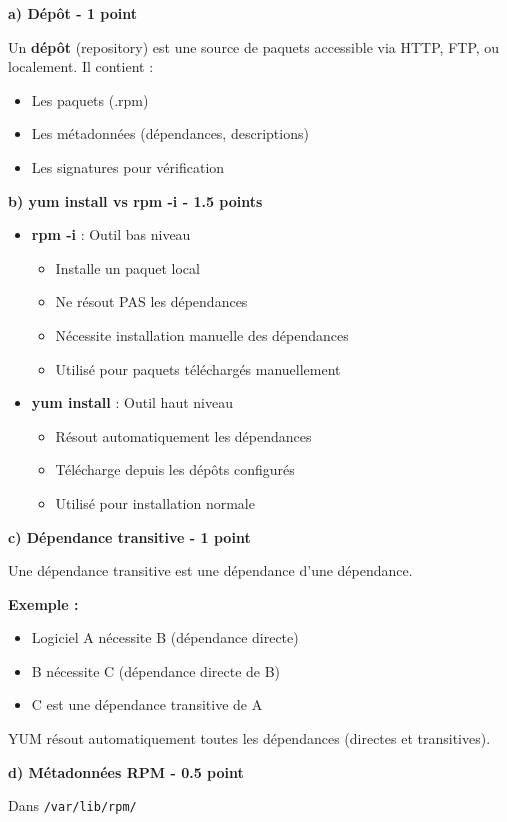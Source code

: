 \documentclass[12pt,a4paper]{article}
\begin{document}
\begin{answerbox}
\textbf{a) Dépôt - 1 point}

Un \textbf{dépôt} (repository) est une source de paquets accessible via HTTP, FTP, ou localement. Il contient :
\begin{itemize}
    \item Les paquets (.rpm)
    \item Les métadonnées (dépendances, descriptions)
    \item Les signatures pour vérification
\end{itemize}

\textbf{b) yum install vs rpm -i - 1.5 points}

\begin{itemize}
    \item \textbf{rpm -i} : Outil bas niveau
    \begin{itemize}
        \item Installe un paquet local
        \item Ne résout PAS les dépendances
        \item Nécessite installation manuelle des dépendances
        \item Utilisé pour paquets téléchargés manuellement
    \end{itemize}
    \item \textbf{yum install} : Outil haut niveau
    \begin{itemize}
        \item Résout automatiquement les dépendances
        \item Télécharge depuis les dépôts configurés
        \item Utilisé pour installation normale
    \end{itemize}
\end{itemize}

\textbf{c) Dépendance transitive - 1 point}

Une dépendance transitive est une dépendance d'une dépendance.

\textbf{Exemple :}
\begin{itemize}
    \item Logiciel A nécessite B (dépendance directe)
    \item B nécessite C (dépendance directe de B)
    \item C est une dépendance transitive de A
\end{itemize}

YUM résout automatiquement toutes les dépendances (directes et transitives).

\textbf{d) Métadonnées RPM - 0.5 point}

Dans \texttt{/var/lib/rpm/}
\end{answerbox}
\end{document}
